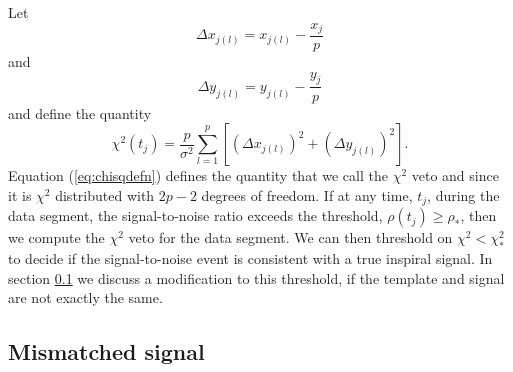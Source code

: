 Let
\begin{equation}
\Delta x_{j(l)} = x_{j(l)} - \frac{x_j}{p}
\end{equation}
and
\begin{equation}
\Delta y_{j(l)} = y_{j(l)} - \frac{y_j}{p}
\end{equation}
and define the quantity
\begin{equation}
\chi^2(t_j) = \frac{p}{\sigma^2} \sum_{l = 1}^p \left[ \left(\Delta x_{j(l)}\right)^2 + \left(\Delta y_{j(l)}\right)^2 \right].
\label{eq:chisqdefn}
\end{equation}
Equation (\ref{eq:chisqdefn}) defines the quantity that we call the $\chi^2$
veto and since it is $\chi^2$ distributed with $2p-2$ degrees of freedom.
If at any time, $t_j$, during the data segment, the signal-to-noise ratio
exceeds the threshold, $\rho(t_j) \ge \rho_\ast$, then we compute the $\chi^2$
veto for the data segment. We can then threshold on $\chi^2 < \chi^2_\ast$ to
decide if the signal-to-noise event is consistent with a true inspiral signal.
In section \ref{ss:mismatchedchisq} we discuss a modification to this
threshold, if the template and signal are not exactly the same.

\subsection{Mismatched signal}
\label{ss:mismatchedchisq}

